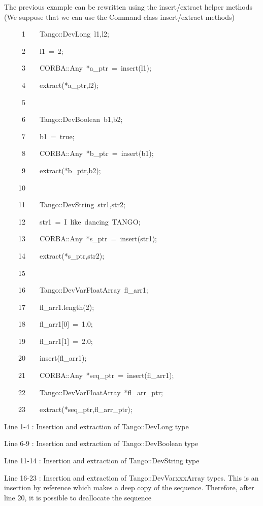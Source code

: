 The previous example can be rewritten using the insert/extract helper
methods (We suppose that we can use the Command class insert/extract
methods)


\begin{lyxcode}
~~~~~1~~~~Tango::DevLong~l1,l2;

~~~~~2~~~~l1~=~2;

~~~~~3~~~~CORBA::Any~{*}a\_ptr~=~insert(l1);

~~~~~4~~~~extract({*}a\_ptr,l2);

~~~~~5~~

~~~~~6~~~~Tango::DevBoolean~b1,b2;

~~~~~7~~~~b1~=~true;

~~~~~8~~~~CORBA::Any~{*}b\_ptr~=~insert(b1);

~~~~~9~~~~extract({*}b\_ptr,b2);

~~~~10~~

~~~~11~~~~Tango::DevString~str1,str2;

~~~~12~~~~str1~=~\textquotedbl{}I~like~dancing~TANGO\textquotedbl{};

~~~~13~~~~CORBA::Any~{*}s\_ptr~=~insert(str1);

~~~~14~~~~extract({*}s\_ptr,str2);

~~~~15~~

~~~~16~~~~Tango::DevVarFloatArray~fl\_arr1;

~~~~17~~~~fl\_arr1.length(2);

~~~~18~~~~fl\_arr1{[}0{]}~=~1.0;

~~~~19~~~~fl\_arr1{[}1{]}~=~2.0;

~~~~20~~~~insert(fl\_arr1);

~~~~21~~~~CORBA::Any~{*}seq\_ptr~=~insert(fl\_arr1);

~~~~22~~~~Tango::DevVarFloatArray~{*}fl\_arr\_ptr;

~~~~23~~~~extract({*}seq\_ptr,fl\_arr\_ptr);
\end{lyxcode}


Line 1-4 : Insertion and extraction of Tango::DevLong type

Line 6-9 : Insertion and extraction of Tango::DevBoolean type 

Line 11-14 : Insertion and extraction of Tango::DevString type

Line 16-23 : Insertion and extraction of Tango::DevVarxxxArray types.
This is an insertion by reference which makes a deep copy of the sequence.
Therefore, after line 20, it is possible to deallocate the sequence


